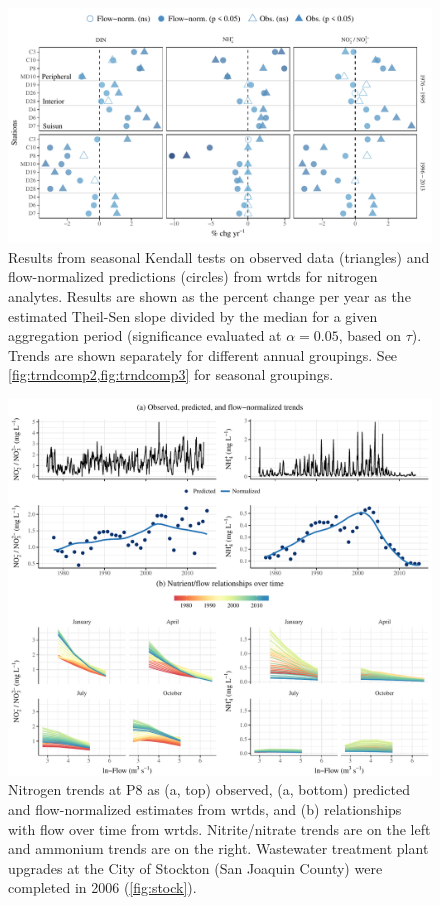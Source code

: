 \documentclass[journal = esthag, manuscript = article]{achemso}\usepackage[]{graphicx}\usepackage[]{color}
\begin{document}
\begin{figure}
\centering
\includegraphics[width=1\textwidth,page=1]{figs/trndcomp1.pdf}
\caption{Results from seasonal Kendall tests on observed data (triangles) and flow-normalized predictions (circles) from \ac{wrtds} for nitrogen analytes. Results are shown as the percent change per year as the estimated Theil-Sen slope divided by the median for a given aggregation period (significance evaluated at $\alpha = 0.05$, based on $\tau$). Trends are shown separately for different annual groupings. See \cref{fig:trndcomp2,fig:trndcomp3} for seasonal groupings.}
\label{fig:trndcomp1}   
\end{figure}

\begin{figure}[!ht]

{\centering \includegraphics[width=\textwidth]{figs/p8trnds-1} 

}

\caption{Nitrogen trends at P8 as (a, top) observed, (a, bottom) predicted and flow-normalized estimates from \ac{wrtds}, and (b) relationships with flow over time from \ac{wrtds}.  Nitrite/nitrate trends are on the left and ammonium trends are on the right.  Wastewater treatment plant upgrades at the City of Stockton (San Joaquin County) were completed in 2006 (\cref{fig:stock}).}\label{fig:p8trnds}
\end{figure}
\end{document}
